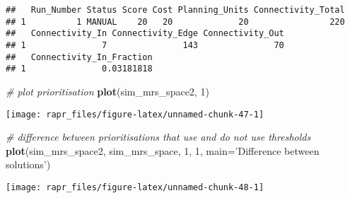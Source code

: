 \documentclass[11pt,]{article}
\newenvironment{Shaded}{\begin{snugshade}}{\end{snugshade}}
\newcommand{\KeywordTok}[1]{\textcolor[rgb]{0.13,0.29,0.53}{\textbf{{#1}}}}
\newcommand{\DataTypeTok}[1]{\textcolor[rgb]{0.13,0.29,0.53}{{#1}}}
\newcommand{\DecValTok}[1]{\textcolor[rgb]{0.00,0.00,0.81}{{#1}}}
\newcommand{\StringTok}[1]{\textcolor[rgb]{0.31,0.60,0.02}{{#1}}}
\newcommand{\CommentTok}[1]{\textcolor[rgb]{0.56,0.35,0.01}{\textit{{#1}}}}
\newcommand{\NormalTok}[1]{{#1}}
\let\origfigure\figure
\let\endorigfigure\endfigure
\renewenvironment{figure}[1][2] {
	\expandafter\origfigure\expandafter[H]
} {
	\endorigfigure
}
\begin{document}
\begin{verbatim}
##   Run_Number Status Score Cost Planning_Units Connectivity_Total
## 1          1 MANUAL    20   20             20                220
##   Connectivity_In Connectivity_Edge Connectivity_Out
## 1               7               143               70
##   Connectivity_In_Fraction
## 1               0.03181818
\end{verbatim}

\begin{Shaded}
\begin{Highlighting}[]
\CommentTok{# plot prioritisation}
\KeywordTok{plot}\NormalTok{(sim_mrs_space2, }\DecValTok{1}\NormalTok{)}
\end{Highlighting}
\end{Shaded}

\begin{figure}

{\centering \texttt{[image: rapr\_files/figure-latex/unnamed-chunk-47-1]} 

}

\caption{A multi-species prioritisation for the uniformly, normally, and bimodally distributed species generated using amount-based targets (20\%) and space-based targets (85\%). This priorititisation was generated to be robust against low occupancy probabilities, by preventing planning units with low probabilities from being used to represent demand points. See Figure 12 caption for conventions.}\label{fig:unnamed-chunk-47}
\end{figure}

\begin{Shaded}
\begin{Highlighting}[]
\CommentTok{# difference between prioritisations that use and do not use thresholds}
\KeywordTok{plot}\NormalTok{(sim_mrs_space2, sim_mrs_space, }\DecValTok{1}\NormalTok{, }\DecValTok{1}\NormalTok{, }\DataTypeTok{main=}\StringTok{'Difference between solutions'}\NormalTok{)}
\end{Highlighting}
\end{Shaded}

\begin{figure}

{\centering \texttt{[image: rapr\_files/figure-latex/unnamed-chunk-48-1]} 

}

\caption{Difference between two multi-species prioritisations. See Figure 7 caption for conventions.}\label{fig:unnamed-chunk-48}
\end{figure}
\end{document}
